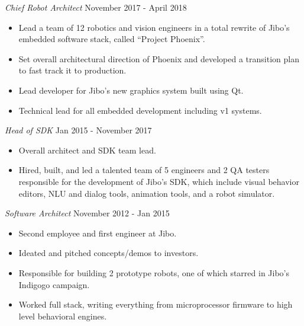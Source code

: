 \documentclass[a4paper]{article}
\begin{document}
\begin{addmargin}[1em]{0em}
\begin{itemize}
    \end{itemize}
    \textit{Chief Robot Architect} \hfill November 2017 - April 2018\\
    \vspace{-1mm}
    \begin{itemize} \itemsep 1pt
        \item Lead a team of 12 robotics and vision engineers in a total rewrite of 
            Jibo's embedded software stack, called ``Project Phoenix''.
        \item Set overall architectural direction of Phoenix and developed
            a transition plan to fast track it to production.
        \item Lead developer for Jibo's new graphics system built using Qt.
        \item Technical lead for all embedded development including v1 systems.
    \end{itemize}
    \textit{Head of SDK} \hfill Jan 2015 - November 2017\\
    \vspace{-1mm}
    \begin{itemize} \itemsep 1pt
        \item Overall architect and SDK team lead.
        \item Hired, built, and led a talented team of 5 engineers and 2 QA testers 
            responsible for the development of Jibo’s SDK, which include visual behavior 
            editors, NLU and dialog tools, animation tools, and a robot simulator.
    \end{itemize}

    \textit{Software Architect} \hfill November 2012 - Jan 2015\\
    \vspace{-1mm}
    \begin{itemize} \itemsep 1pt
        \item Second employee and first engineer at Jibo.
        \item Ideated and pitched concepts/demos to investors.
        \item Responsible for building 2 prototype robots, one of which starred in Jibo's
            Indigogo campaign.
        \item Worked full stack, writing everything from microprocessor firmware to 
            high level behavioral engines.
    \end{itemize}
\end{addmargin}
\end{document}
